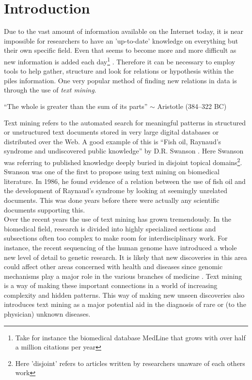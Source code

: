 \chapter{Introduction\label{Introduction}}

Due to the vast amount of information available on the Internet today,
it is near impossible for researchers to have an 'up-to-date'
knowledge on everything but their own specific field. Even that seems
to become more and more difficult as new information is added each
day\footnote{Take for instance the biomedical database MedLine that
  grows with over half a million citations per year}
\cite{CitAddMedLine}. Therefore it can be necessary to employ tools to
help gather, structure and look for relations or hypothesis within the
piles information. One very popular method of finding new relations in
data is through the use of \textit{text mining}.

\begin{center}
{\small``The whole is greater than the sum of its parts'' $\sim$ Aristotle
(384--322 BC)} 
\end{center}

Text mining refers to the automated search for meaningful patterns in
structured or unstructured text documents stored in very large digital
databases or distributed over the Web. A good example of this is
``Fish oil, Raynaud's syndrome and undiscovered public knowledge'' by
D.R. Swanson \cite{DRSwanson}. Here Swanson was referring to published
knowledge deeply buried in disjoint topical domains\footnote{Here
  'disjoint' refers to articles written by researchers unaware of each
  others work}. Swanson was one of the first to propose using text
mining on biomedical literature. In 1986, he found evidence of a
relation between the use of fish oil and the development of Raynaud's
syndrome by looking at seemingly unrelated documents. This was done
years before there were actually any scientific documents supporting
this. \\

Over the recent years the use of text mining has grown
tremendously. In the biomedical field, research is divided into highly
specialized sections and subsections often too complex to make room
for interdisciplinary work. For instance, the recent sequencing of the
human genome have introduced a whole new level of detail to genetic
research. It is likely that new discoveries in this area could affect
other areas concerned with health and diseases since genomic
mechanisms play a major role in the various branches of medicine
\cite{survey.biomed.text.cohen.2005}. Text mining is a way of making
these important connections in a world of increasing complexity and
hidden patterns. This way of making new unseen discoveries also
introduces text mining as a major potential aid in the diagnosis of
rare or (to the physician) unknown diseases.\\

